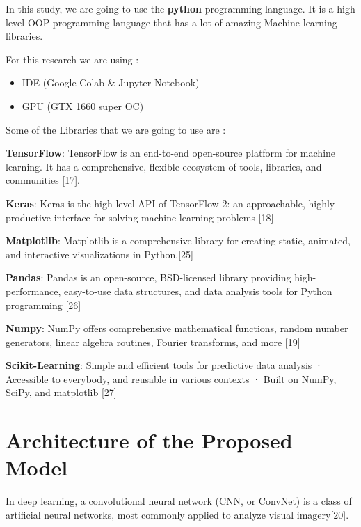 \noindent In this study, we are going to use the \textbf{python} programming language. It is a high level OOP programming language that has a lot of amazing Machine learning libraries.

\vspace{5mm}
\noindent For this research we are using :

\begin{itemize}
    \item IDE (Google Colab & Jupyter Notebook)
    \item GPU (GTX 1660 super OC)
\end{itemize}

\newpage
\noindent Some of the Libraries that we are going to use are :

\vspace{5mm}
\noindent \textbf{TensorFlow}: TensorFlow is an end-to-end open-source platform for machine learning. It has a comprehensive, flexible ecosystem of tools, libraries, and communities [17].

\vspace{5mm}
\noindent \textbf{Keras}: Keras is the high-level API of TensorFlow 2: an approachable, highly-productive interface for solving machine learning problems [18]

\vspace{5mm}
\noindent \textbf{Matplotlib}: Matplotlib is a comprehensive library for creating static, animated, and interactive visualizations in Python.[25]

\vspace{5mm}
\noindent \textbf{Pandas}: Pandas is an open-source, BSD-licensed library providing high-performance, easy-to-use data structures, and data analysis tools for Python programming [26]

\vspace{5mm}
\noindent \textbf{Numpy}: NumPy offers comprehensive mathematical functions, random number generators, linear algebra routines, Fourier transforms, and more [19]

\vspace{5mm}
\noindent \textbf{Scikit-Learning}: Simple and efficient tools for predictive data analysis · Accessible to everybody, and reusable in various contexts · Built on NumPy, SciPy, and matplotlib [27]
 
\section{Architecture of the Proposed Model}
In deep learning, a convolutional neural network (CNN, or ConvNet) is a class of artificial neural networks, most commonly applied to analyze visual imagery[20].

